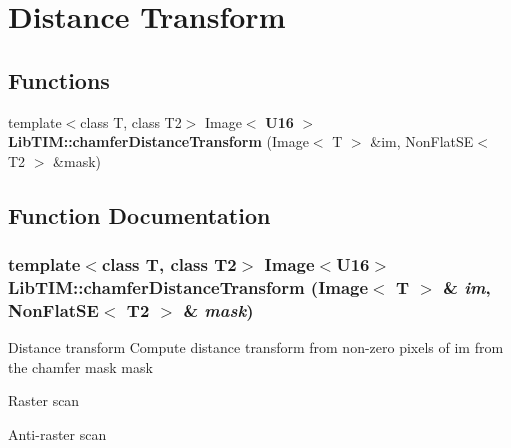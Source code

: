 \section{Distance Transform}
\label{group__DistanceTransform}
\subsection*{Functions}
\begin{CompactItemize}
\item 
template$<$class T, class T2$>$ Image$<$ {\bf U16} $>$ {\bf Lib\-TIM::chamfer\-Distance\-Transform} (Image$<$ T $>$ \&im, Non\-Flat\-SE$<$ T2 $>$ \&mask)
\end{CompactItemize}


\subsection{Function Documentation}
\subsubsection{\setlength{\rightskip}{0pt plus 5cm}template$<$class T, class T2$>$ Image$<${\bf U16}$>$ Lib\-TIM::chamfer\-Distance\-Transform (Image$<$ T $>$ \& {\em im}, Non\-Flat\-SE$<$ T2 $>$ \& {\em mask})}\label{group__DistanceTransform_ga0}


Distance transform Compute distance transform from non-zero pixels of im from the chamfer mask mask

Raster scan

Anti-raster scan 